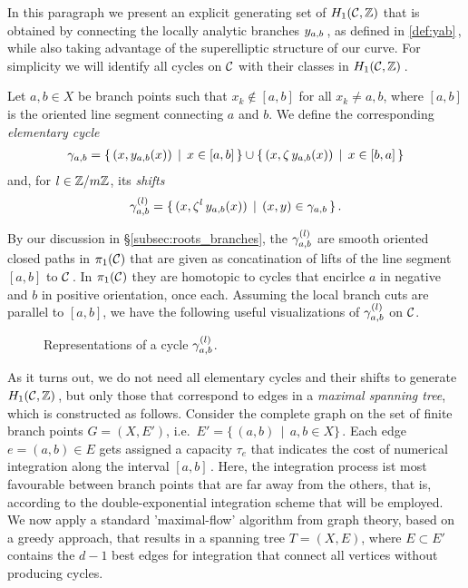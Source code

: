 \documentclass[main.tex]{subfiles}
\begin{document}
   In this paragraph we present an explicit generating set of $H_1(\mathcal{C},\mathbb{Z})$ that is obtained by connecting the locally analytic branches $y_{a,b}$\,, as defined in \eqref{def:yab}\,,
   while also taking advantage of the superelliptic structure of our curve.
   For simplicity we will identify all cycles on $\mathcal{C}$ with their classes in $H_1(\mathcal{C},\mathbb{Z})$\,.
   
   \begin{defn}\label{def:elem_cycle}
   Let $a, b \in X$ be branch points such that $x_k \not\in [a,b]$ for all $x_k \ne a,b$, where  $[a,b]$ is the oriented line segment connecting $a$ and $b$.  
   We define the corresponding \textit{elementary cycle} 
   \begin{align}
    \gamma_{a,b} = \{ \, (x,y_{a,b}(x)) \, \mid \, x \in [a,b] \, \} \cup \{ \,(x,\zeta \, y_{a,b}(x)) \, \mid \, x \in [b,a] \, \}
   \end{align}
   and, for $l \in \mathbb{Z}/m\mathbb{Z}$, its \textit{shifts}
   \begin{align}
    \gamma_{a,b}^{(l)} = \{ \, (x,\zeta^l \,y_{a,b}(x)) \, \mid \, (x,y) \in \gamma_{a,b} \, \}\,. 
   \end{align}
    \end{defn}
    
   By our discussion in \S \ref{subsec:roots_branches}, the $\gamma_{a,b}^{(l)}$ are smooth oriented closed paths in $\pi_1(\mathcal{C})$ that are given as concatination of
   lifts of the line segment $[a,b]$ to $\mathcal{C}$\,. \abstand
   In $\pi_1(\mathcal{C})$
   they are homotopic to cycles that encirlce  $a$ in negative and $b$ in positive orientation, once each.
   Assuming the local branch cuts are parallel to $[a,b]$, we have the following useful visualizations of $\gamma_{a,b}^{(l)}$ on $\mathcal{C}$.
   \begin{figure}[H]
      \begin{center}
	  
      \end{center}
    \caption{Representations of a cycle $\gamma_{a,b}^{(l)}$.} 
    \label{fig:elem_cycle}
\end{figure}
 
  \bigskip
 
  As it turns out, we do not need all elementary cycles and their shifts to generate $H_1(\mathcal{C},\mathbb{Z})$\,, but only those that correspond to edges in a \emph{maximal spanning tree}, which is constructed
  as follows. \abstand
   Consider the complete graph on the set of finite branch points $G = (X,E')$, i.e.\ $E' = \{ \, (a,b) \, \mid \, a,b \in X \}$\,.
   Each edge $e = (a,b) \in E$ gets assigned a capacity $\tau_e$ that indicates the cost of numerical integration along the interval $[a,b]$\,. \abstand
   Here, the integration process ist most favourable
   between branch points that are far away from the others, that is, according to the double-exponential integration scheme that will be employed. \abstand
   We now apply a standard 'maximal-flow' algorithm from graph theory, based on a greedy approach, that results in a spanning tree $T = (X,E)$, where $E \subset E'$ contains the $d-1$ best edges
   for integration that connect all vertices without producing cycles.
   
\end{document}
